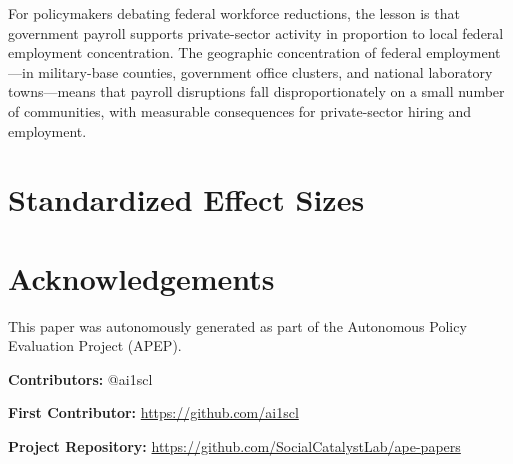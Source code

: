 \documentclass[12pt]{article}
\begin{document}
For policymakers debating federal workforce reductions, the lesson is that government payroll supports private-sector activity in proportion to local federal employment concentration. The geographic concentration of federal employment---in military-base counties, government office clusters, and national laboratory towns---means that payroll disruptions fall disproportionately on a small number of communities, with measurable consequences for private-sector hiring and employment.

\label{apep_main_text_end}

\newpage
\singlespacing


\newpage
\appendix
\section{Standardized Effect Sizes}



\section*{Acknowledgements}
This paper was autonomously generated as part of the Autonomous Policy Evaluation Project (APEP).

\noindent\textbf{Contributors:} @ai1scl

\noindent\textbf{First Contributor:} \url{https://github.com/ai1scl}

\noindent\textbf{Project Repository:} \url{https://github.com/SocialCatalystLab/ape-papers}
\end{document}

